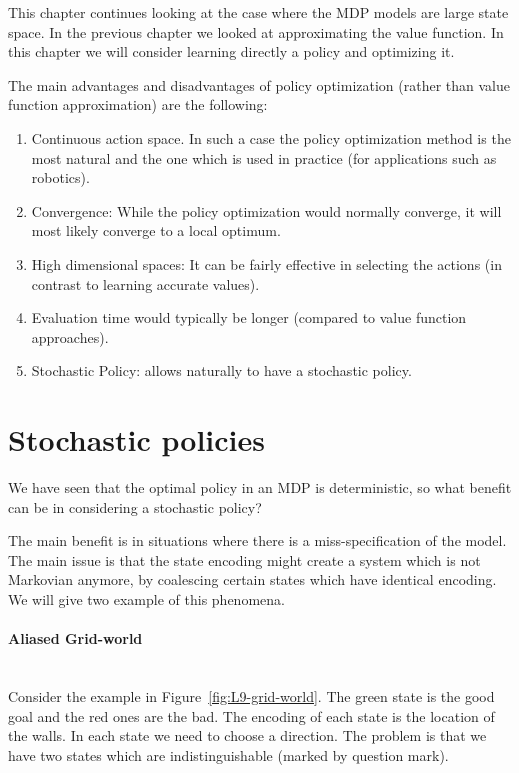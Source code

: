 This chapter continues looking at the case where the MDP models are
large state space. In the previous chapter we looked at
approximating the value function. In this chapter we will consider
learning directly a policy and optimizing it.

The main advantages and disadvantages of policy optimization (rather
than value function approximation) are the following:
\begin{enumerate}
\item
Continuous action space. In such a case the policy optimization
method is the most natural and the one which is used in practice
(for applications such as robotics).
\item
Convergence: While the policy optimization would normally converge,
it will most likely converge to a local optimum.
\item
High dimensional spaces: It can be fairly effective in selecting the
actions (in contrast to learning accurate values).
\item
Evaluation time would typically be longer (compared to value
function approaches).
\item
Stochastic Policy: allows naturally to have a stochastic policy.
\end{enumerate}

\section{Stochastic policies}

We have seen that the optimal policy in an MDP is deterministic, so
what benefit can be in considering a stochastic policy?

The main benefit is in situations where there is a
miss-specification of the model. The main issue is that the state
encoding might create a system which is not Markovian anymore, by
coalescing certain states which have identical encoding. We will
give two example of this phenomena.

\paragraph{Aliased Grid-world}\ \\
Consider the example in Figure~\ref{fig:L9-grid-world}. The green
state is the good goal and the red ones are the bad. The encoding of
each state is the location of the walls. In each state we need to
choose a direction. The problem is that we have two states which are
indistinguishable (marked by question mark).

